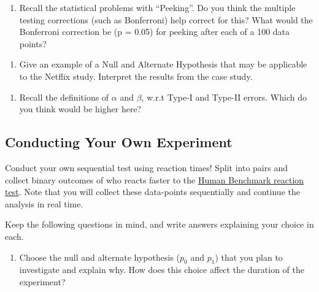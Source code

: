 \documentclass[
  letterpaper,
  DIV=11,
  numbers=noendperiod]{scrartcl}
\providecommand{\tightlist}{%
  \setlength{\itemsep}{0pt}\setlength{\parskip}{0pt}}
\begin{document}
\hfill\break
\hfill\break
\hfill\break
\hfill\break
\hfill\break
\hfill\break

\begin{enumerate}
\def\labelenumi{\arabic{enumi}.}
\setcounter{enumi}{2}
\tightlist
\item
  Recall the statistical problems with ``Peeking''. Do you think the
  multiple testing corrections (such as Bonferroni) help correct for
  this? What would the Bonferroni correction be (p = 0.05) for peeking
  after each of a 100 data points?
\end{enumerate}

\hfill\break
\hfill\break
\hfill\break
\hfill\break
\hfill\break
\hfill\break
\hfill\break

\begin{enumerate}
\def\labelenumi{\arabic{enumi}.}
\setcounter{enumi}{3}
\tightlist
\item
  Give an example of a Null and Alternate Hypothesis that may be
  applicable to the Netflix study. Interpret the results from the case
  study.
\end{enumerate}

\hfill\break
\hfill\break
\hfill\break
\hfill\break
\hfill\break
\hfill\break
\hfill\break

\begin{enumerate}
\def\labelenumi{\arabic{enumi}.}
\setcounter{enumi}{4}
\tightlist
\item
  Recall the definitions of \(\alpha\) and \(\beta\), w.r.t Type-I and
  Type-II errors. Which do you think would be higher here?
\end{enumerate}

\hfill\break
\hfill\break
\hfill\break
\hfill\break
\hfill\break
\hfill\break

\subsection{Conducting Your Own
Experiment}\label{conducting-your-own-experiment}

Conduct your own sequential test using reaction times! Split into pairs
and collect binary outcomes of who reacts faster to the
\href{https://humanbenchmark.com/tests/reactiontime}{Human Benchmark
reaction test}. Note that you will collect these data-points
sequentially and continue the analysis in real time.

Keep the following questions in mind, and write answers explaining your
choice in each.

\begin{enumerate}
\def\labelenumi{\arabic{enumi}.}
\setcounter{enumi}{5}
\tightlist
\item
  Choose the null and alternate hypothesis (\(p_{0}\) and \(p_{1}\))
  that you plan to investigate and explain why. How does this choice
  affect the duration of the experiment?
\end{enumerate}
\end{document}
